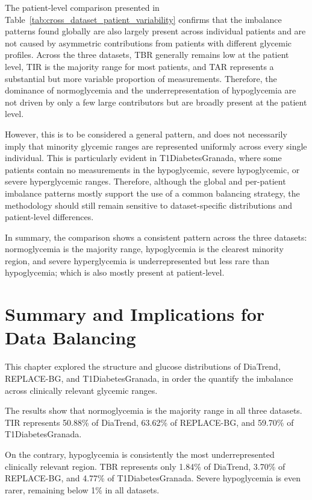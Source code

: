 The patient-level comparison presented in Table~\ref{tab:cross_dataset_patient_variability} confirms that the imbalance patterns found globally are also largely present across individual patients and are not caused by asymmetric contributions from patients with different glycemic profiles. Across the three datasets, TBR generally remains low at the patient level, TIR is the majority range for most patients, and TAR represents a substantial but more variable proportion of measurements. Therefore, the dominance of normoglycemia and the underrepresentation of hypoglycemia are not driven by only a few large contributors but are broadly present at the patient level.

However, this is to be considered a general pattern, and does not necessarily imply that minority glycemic ranges are represented uniformly across every single individual. This is particularly evident in T1DiabetesGranada, where some patients contain no measurements in the hypoglycemic, severe hypoglycemic, or severe hyperglycemic ranges. Therefore, although the global and per-patient imbalance patterns mostly support the use of a common balancing strategy, the methodology should still remain sensitive to dataset-specific distributions and patient-level differences.

In summary, the comparison shows a consistent pattern across the three datasets: normoglycemia is the majority range, hypoglycemia is the clearest minority region, and severe hyperglycemia is underrepresented but less rare than hypoglycemia; which is also mostly present at patient-level.

\section{Summary and Implications for Data Balancing}
\label{sec:eda_summary}

This chapter explored the structure and glucose distributions of DiaTrend, REPLACE-BG, and T1DiabetesGranada, in order the quantify the imbalance across clinically relevant glycemic ranges.

The results show that normoglycemia is the majority range in all three datasets. TIR represents 50.88\% of DiaTrend, 63.62\% of REPLACE-BG, and 59.70\% of T1DiabetesGranada. 

On the contrary, hypoglycemia is consistently the most underrepresented clinically relevant region. TBR represents only 1.84\% of DiaTrend, 3.70\% of REPLACE-BG, and 4.77\% of T1DiabetesGranada. Severe hypoglycemia is even rarer, remaining below 1\% in all datasets.

